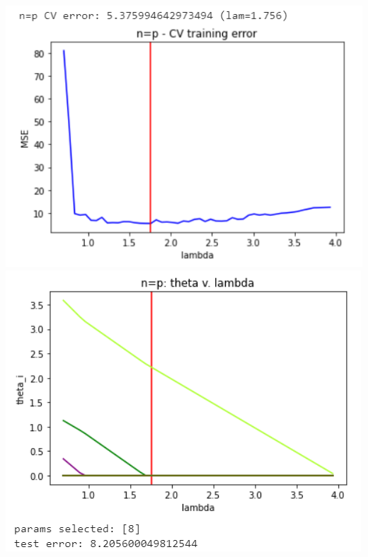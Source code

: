 \documentclass[11pt]{article}
\begin{document}
\begin{center}
\includegraphics[scale=0.7]{charts/lasso_ortho_n_eq_p_err.PNG}
\includegraphics[scale=0.7]{charts/lasso_ortho_n_eq_p_thetas.PNG}


\end{center}
\end{document}
